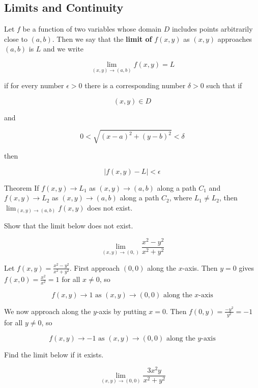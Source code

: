     \subsection{Limits and Continuity}  %

        Let $f$ be a function of two variables whose domain $D$ includes points arbitrarily close to $(a,b)$. Then we say that the \textbf{limit of} $f(x,y)$ as $(x,y)$ approaches $(a,b)$ is $L$ and we write

        \[
            \lim_{(x,y)\to (a,b)} f(x,y) = L
        \]

        if for every number $\epsilon > 0$ there is a corresponding number $\delta > 0$ such that if

        \[
            (x,y) \in D
        \]

        and

        \[
            0 < \sqrt{(x-a)^2 + (y-b)^2} < \delta
        \]

        then

        \[
            |f(x,y) - L| < \epsilon
        \]

        \begin{theorem}{Theorem}
            If $f(x,y)\to L_1$ as $(x,y)\to (a,b)$ along a path $C_1$ and $f(x,y) \to L_2$ as $(x,y)\to (a,b)$ along a path $C_2$, where $L_1 \not = L_2$, then $\lim_{(x,y)\to (a,b)}f(x,y)$ does not exist.
        \end{theorem}

        \textit{} Show that the limit below does not exist.

        \[
            \lim_{(x,y)\to (0,)} \frac{x^2 - y^2}{x^2 + y^2}
        \]

        Let $f(x,y) = \frac{x^2 - y^2}{x^2 + y^2}$. First approach $(0,0)$ along the $x$-axis. Then $y=0$ gives $f(x,0) = \frac{x^2}{x^2} = 1$ for all $x\not = 0$, so

        \[
            f(x,y)\to 1 \text{ as } (x,y)\to (0,0) \text{ along the } x\text{-axis}
        \]

        We now approach along the $y$-axis by putting $x=0$. Then $f(0,y)=\frac{-y^2}{y^2}=-1$ for all $y\not = 0$, so

        \[
            f(x,y)\to -1\text{ as } (x,y)\to (0,0) \text{ along the }y\text{-axis}
        \]

        \textit{} Find the limit below if it exists.

        \[
            \lim_{(x,y)\to (0,0)} \frac{3x^2 y}{x^2 + y^2}
        \]

